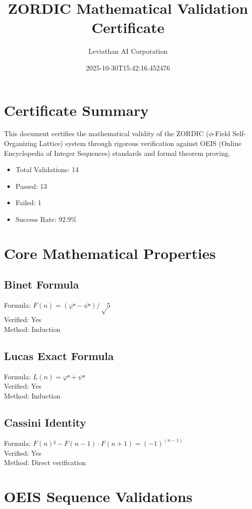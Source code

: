 \documentclass{article}
\title{ZORDIC Mathematical Validation Certificate}
\author{Leviathan AI Corporation}
\date{2025-10-30T15:42:16.452476}
\begin{document}
\maketitle

\section{Certificate Summary}

This document certifies the mathematical validity of the ZORDIC ($\phi$-Field Self-Organizing Lattice) system through rigorous verification against OEIS (Online Encyclopedia of Integer Sequences) standards and formal theorem proving.

\begin{itemize}
    \item Total Validations: 14
    \item Passed: 13
    \item Failed: 1
    \item Success Rate: 92.9\%
\end{itemize}

\section{Core Mathematical Properties}

\subsection{Binet Formula}
Formula: $F(n) = (φⁿ - ψⁿ) / √5$ \\
Verified: Yes \\
Method: Induction

\subsection{Lucas Exact Formula}
Formula: $L(n) = φⁿ + ψⁿ$ \\
Verified: Yes \\
Method: Induction

\subsection{Cassini Identity}
Formula: $F(n)² - F(n-1)·F(n+1) = (-1)^(n-1)$ \\
Verified: Yes \\
Method: Direct verification


\section{OEIS Sequence Validations}
\end{document}
